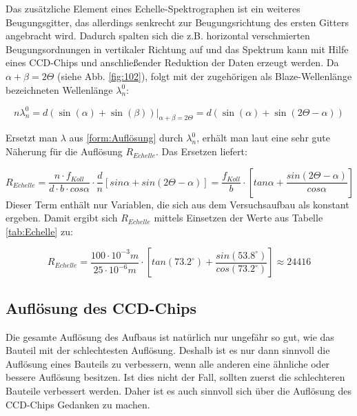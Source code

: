 Das zusätzliche Element eines Echelle-Spektrographen ist ein weiteres Beugungsgitter, das allerdings senkrecht zur Beugungsrichtung des ersten Gitters angebracht wird. Dadurch spalten sich die z.B. horizontal verschmierten Beugungsordnungen in vertikaler Richtung auf und das Spektrum kann mit Hilfe eines CCD-Chips und anschließender Reduktion der Daten erzeugt werden. Da $ \alpha + \beta = 2 \Theta $ (siehe Abb. \ref{fig:102}), folgt mit der zugehörigen als Blaze-Wellenlänge bezeichneten Wellenlänge $ \lambda_n^0 $:

\begin{equation}
n \lambda_n^0 = d ( \sin(\alpha) + \sin(\beta) ) \vert_{\alpha + \beta = 2 \Theta} = d ( \sin(\alpha) + \sin(2 \Theta - \alpha) )
\end{equation} 

Ersetzt man $\lambda$ aus \eqref{form:Auflösung} durch $ \lambda_n^0 $, erhält man laut \cite{ronomischesPraktikum} eine sehr gute Näherung für die Auflösung $ R_{Echelle} $. Das Ersetzen liefert:

\begin{equation}
R_{Echelle} = \frac{n\cdot f_{Koll}}{d\cdot b\cdot cos \alpha}\cdot \frac{d}{n}[sin \alpha + sin(2\Theta-\alpha)] = \frac{f_{Koll}}{b}\cdot \left[tan \alpha + \frac{sin(2\Theta-\alpha)}{cos \alpha}\right]
\label{form:R_Echelle}
\end{equation}
Dieser Term enthält nur Variablen, die sich aus dem Versuchsaufbau als konstant ergeben. Damit ergibt sich $ R_{Echelle} $ mittels Einsetzen der Werte aus Tabelle \ref{tab:Echelle} zu:

\begin{equation}
R_{Echelle} = \frac{100 \cdot 10^{-3}m}{25 \cdot 10^{-6}m}\cdot \left[tan (73.2^{\circ}) + \frac{sin(53.8^{\circ})}{cos (73.2^{\circ})}\right] \approx 24416
\end{equation}

\subsection{Auflösung des CCD-Chips}
Die gesamte Auflösung des Aufbaus ist natürlich nur ungefähr so gut, wie das Bauteil mit der schlechtesten Auflösung. Deshalb ist es nur dann sinnvoll die Auflösung eines Bauteils zu verbessern, wenn alle anderen eine ähnliche oder bessere Auflösung besitzen. Ist dies nicht der Fall, sollten zuerst die schlechteren Bauteile verbessert werden. Daher ist es auch sinnvoll sich über die Auflösung des CCD-Chips Gedanken zu machen.\\

